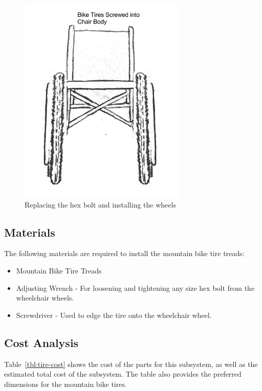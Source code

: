 \documentclass[12pt]{report}
\begin{document}
\begin{figure}[H]
    \centering
    \includegraphics[height=10cm]{tires/replace}
    \caption{Replacing the hex bolt and installing the wheels}
    \label{fig:tires-step6}
\end{figure}

\subsection{Materials}
The following materials are required to install the mountain bike tire treads:

\begin{itemize}
    \item Mountain Bike Tire Treads
    \item Adjusting Wrench - For loosening and tightening any size hex bolt from the wheelchair
        wheels.
    \item Screwdriver - Used to edge the tire onto the wheelchair wheel.
\end{itemize}

\subsection{Cost Analysis}
Table~\ref{tbl:tire-cost} shows the cost of the parts for this subsystem, as
well as the estimated total cost of the subsystem. The table also
provides the preferred dimensions for the mountain bike tires.
\end{document}
